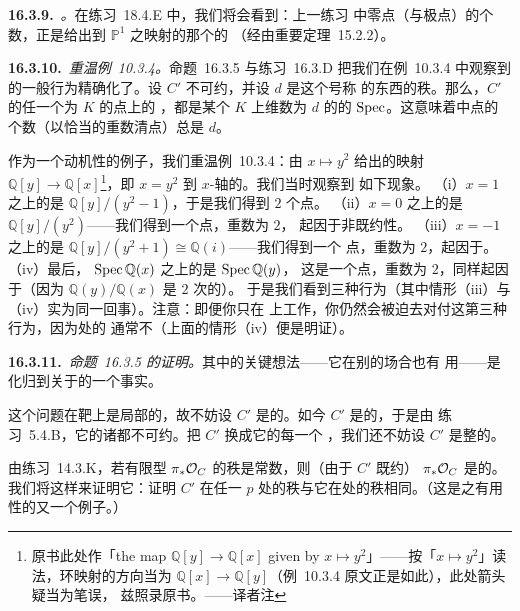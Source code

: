 \textbf{16.3.9.}\ \emph{\trhRemark{}。}\quad 在\mbox{练习~18.4.E} 中，我们将会看到：上一练习
中零点（与极点）的个数，正是给出到 $\mathbb{P}^1$ 之映射的那个\trLineBundle{}的%
\trDegree（经由\mbox{重要定理~15.2.2}）。

\textbf{16.3.10.}\ \emph{重温\mbox{例~10.3.4}。}\quad \mbox{命题~16.3.5} 与\mbox{练习~16.3.D}
把我们在\mbox{例~10.3.4} 中观察到的一般行为精确化了。设 $C'$ 不可约，并设 $d$ 是这个号称%
\trLocallyFreeSheaf{}的东西的秩。那么，$C'$ 的任一个\trResidueField{}为 $K$ 的点上的%
\trFiber，都是某个 $K$ 上维数为 $d$ 的\trAlgebra{}的 $\operatorname{Spec}$。这意味着\trFiber{}中点的
个数（以恰当的重数清点）总是 $d$。

作为一个动机性的例子，我们重温\mbox{例~10.3.4}：由 $x\mapsto y^2$ 给出的映射
$\mathbb{Q}[y]\to\mathbb{Q}[x]$\footnote{原书此处作「the map $\mathbb{Q}[y]\to\mathbb{Q}[x]$
given by $x\mapsto y^2$」——按「$x\mapsto y^2$」读法，环映射的方向当为
$\mathbb{Q}[x]\to\mathbb{Q}[y]$（\mbox{例~10.3.4} 原文正是如此），此处箭头疑当为笔误，
兹照录原书。——译者注}，即\trParabola{} $x=y^2$ 到 $x$-轴的\trProjection。我们当时观察到
如下现象。
（i）$x=1$ 之上的\trFiber{}是 $\mathbb{Q}[y]/(y^2-1)$，于是我们得到 $2$ 个点。
（ii）$x=0$ 之上的\trFiber{}是 $\mathbb{Q}[y]/(y^2)$——我们得到一个点，重数为 $2$，
起因于非既约性。
（iii）$x=-1$ 之上的\trFiber{}是 $\mathbb{Q}[y]/(y^2+1)\cong\mathbb{Q}(i)$——我们得到一个
点，重数为 $2$，起因于\trFieldExtension。
（iv）最后，\trGenericPoint{} $\operatorname{Spec}\mathbb{Q}(x)$ 之上的\trFiber{}是 $\operatorname{Spec}\mathbb{Q}(y)$，
这是一个点，重数为 $2$，同样起因于\trFieldExtension（因为 $\mathbb{Q}(y)/\mathbb{Q}(x)$
是 $2$ 次的\trFieldExtension）。
于是我们看到三种行为（其中情形（iii）与（iv）实为同一回事）。注意：即便你只在%
\trAlgClosedField{}上工作，你仍然会被迫去对付这第三种行为，因为\trGenericPoint{}处的%
\trResidueField{}通常不\trAlgClosed（上面的情形（iv）便是明证）。

\textbf{16.3.11.}\ \emph{\mbox{命题~16.3.5} 的证明。}\quad 其中的关键想法——它在别的场合也有
用——是化归到关于\trDVR{}的一个事实。

这个问题在靶上是局部的，故不妨设 $C'$ 是\trAffine{}的。如今 $C'$ 是\trNormal{}的，于是由
\mbox{练习~5.4.B}，它的诸\trConnectedComponent{}都不可约。把 $C'$ 换成它的每一个%
\trIrreducibleComponent，我们还不妨设 $C'$ 是整的。

由\mbox{练习~14.3.K}，若有限型\trQCSheaf{} $\pi_*\mathcal{O}_C$ 的秩是常数，则（由于 $C'$ 既约）
$\pi_*\mathcal{O}_C$ 是\trLocallyFree{}的。我们将这样来证明它：证明 $C'$ 在任一\trClosedPoint{} $p$
处的秩与它在\trGenericPoint{}处的秩相同。（这是\trGenericPoint{}之有用性的又一个例子。）

